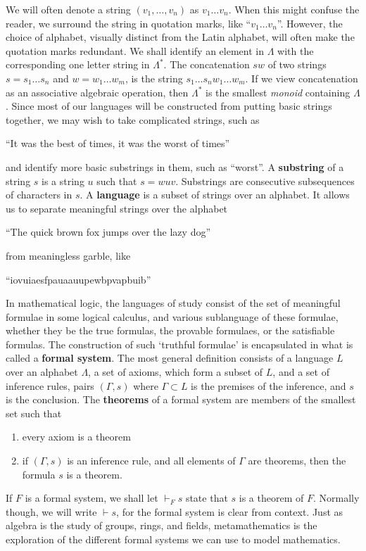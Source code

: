 We will often denote a string $(v_1, \dots, v_n)$ as $v_1 \dots v_n$. When this might confuse the reader, we surround the string in quotation marks, like ``$v_1 \dots v_n$''. However, the choice of alphabet, visually distinct from the Latin alphabet, will often make the quotation marks redundant. We shall identify an element in $\Lambda$ with the corresponding one letter string in $\Lambda^*$. The concatenation $sw$ of two strings $s = s_1 \dots s_n$ and $w = w_1 \dots w_m$, is the string $s_1 \dots s_n w_1 \dots w_m$. If we view concatenation as an associative algebraic operation, then $\Lambda^*$ is the smallest {\it monoid} containing $\Lambda$. Since most of our languages will be constructed from putting basic strings together, we may wish to take complicated strings, such as
%
\begin{center}
    ``It was the best of times, it was the worst of times''
\end{center}
%
and identify more basic substrings in them, such as ``worst''. A {\bf substring} of a string $s$ is a string $u$ such that $s = wuv$. Substrings are consecutive subsequences of characters in $s$. A {\bf language} is a subset of strings over an alphabet. It allows us to separate meaningful strings over the alphabet
%
\begin{center}
    ``The quick brown fox jumps over the lazy dog''
\end{center}
%
from meaningless garble, like
%
\begin{center}
    ``iovuiaesfpauaauupewbpvapbuib''
\end{center}
%
In mathematical logic, the languages of study consist of the set of meaningful formulae in some logical calculus, and various sublanguage of these formulae, whether they be the true formulas, the provable formulaes, or the satisfiable formulas. The construction of such `truthful formulae' is encapsulated in what is called a {\bf formal system}. The most general definition consists of a language $L$ over an alphabet $\Lambda$, a set of axioms, which form a subset of $L$, and a set of inference rules, pairs $(\Gamma, s)$ where $\Gamma \subset L$ is the premises of the inference, and $s$ is the conclusion. The {\bf theorems} of a formal system are members of the smallest set such that
%
\begin{enumerate}
    \item every axiom is a theorem
    \item if $(\Gamma, s)$ is an inference rule, and all elements of $\Gamma$ are theorems, then the formula $s$ is a theorem.
\end{enumerate}
%
If $F$ is a formal system, we shall let $\vdash_F s$ state that $s$ is a theorem of $F$. Normally though, we will write $\vdash s$, for the formal system is clear from context. Just as algebra is the study of groups, rings, and fields, metamathematics is the exploration of the different formal systems we can use to model mathematics.

